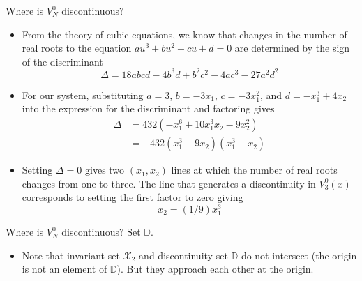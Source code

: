 \documentclass{beamer}
\newcommand{\bbD}{\mathbb{D}}
\begin{document}
\begin{frame}{Where is $V_N^0$ discontinuous?}

\begin{itemize}
\item From the theory of cubic equations, we know that changes in the number
of real roots to the equation $au^3+bu^2+cu+d=0$ are determined by the
sign of the discriminant 
\begin{equation*}
\Delta = 18 abcd - 4b^3d + b^2c^2 -4ac^3 -27 a^2 d^2
\end{equation*}

\item For our system, substituting $a=3$, $b=-3x_1$, $c=-3x_1^2$, and
$d=-x_1^3+4x_2$ into the expression for the discriminant and factoring
gives 
\begin{align*}
\Delta &= 432 (-x_1^6 + 10 x_1^3x_2 - 9 x_2^2)\\
       &= -432 (x_1^3 - 9 x_2)(x_1^3 -x_2)
\end{align*}

\item Setting $\Delta=0$ gives two $(x_1, x_2)$ lines at which the number
of real roots changes from one to three. The line that generates a discontinuity in
$V_3^0(x)$ corresponds to setting the first factor to zero giving
\begin{equation*}
x_2 = (1/9) x_1^3
\end{equation*}
\end{itemize}
\end{frame}


\begin{frame}{Where is $V_N^0$ discontinuous? Set $\bbD$.}


\centerline{\resizebox{0.75\textwidth}{!}{}}
\begin{itemize}

\item Note that invariant set $\mathcal{X}_2$ and discontinuity set
  $\bbD$   do not intersect (the origin is not an element of
  $\bbD$). But they approach each other at the origin.
\end{itemize}
\end{frame}
\end{document}
